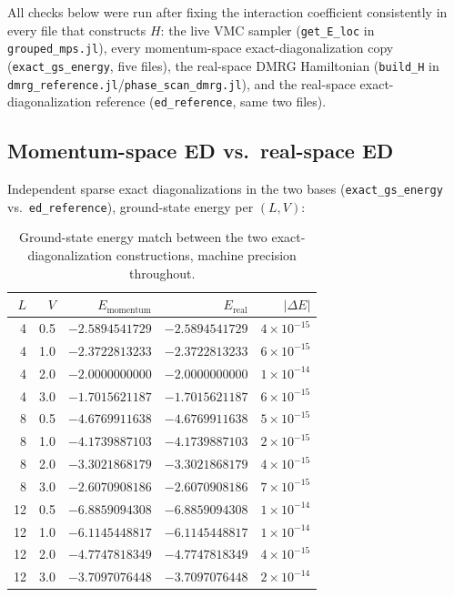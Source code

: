 \documentclass[11pt]{article}
\begin{document}
All checks below were run after fixing the interaction coefficient
consistently in every file that constructs $H$: the live VMC sampler
(\texttt{get\_E\_loc} in \texttt{grouped\_mps.jl}), every momentum-space
exact-diagonalization copy (\texttt{exact\_gs\_energy}, five files), the
real-space DMRG Hamiltonian (\texttt{build\_H} in
\texttt{dmrg\_reference.jl}/\texttt{phase\_scan\_dmrg.jl}), and the
real-space exact-diagonalization reference (\texttt{ed\_reference}, same two
files).

\subsection{Momentum-space ED vs.\ real-space ED}

Independent sparse exact diagonalizations in the two bases
(\texttt{exact\_gs\_energy} vs.\ \texttt{ed\_reference}), ground-state
energy per $(L,V)$:

\begin{table}[h]
\centering
\begin{tabular}{@{}rrrrr@{}}
\toprule
$L$ & $V$ & $E_{\text{momentum}}$ & $E_{\text{real}}$ & $|\Delta E|$ \\
\midrule
4  & 0.5 & $-2.5894541729$ & $-2.5894541729$ & $4\times10^{-15}$ \\
4  & 1.0 & $-2.3722813233$ & $-2.3722813233$ & $6\times10^{-15}$ \\
4  & 2.0 & $-2.0000000000$ & $-2.0000000000$ & $1\times10^{-14}$ \\
4  & 3.0 & $-1.7015621187$ & $-1.7015621187$ & $6\times10^{-15}$ \\
8  & 0.5 & $-4.6769911638$ & $-4.6769911638$ & $5\times10^{-15}$ \\
8  & 1.0 & $-4.1739887103$ & $-4.1739887103$ & $2\times10^{-15}$ \\
8  & 2.0 & $-3.3021868179$ & $-3.3021868179$ & $4\times10^{-15}$ \\
8  & 3.0 & $-2.6070908186$ & $-2.6070908186$ & $7\times10^{-15}$ \\
12 & 0.5 & $-6.8859094308$ & $-6.8859094308$ & $1\times10^{-14}$ \\
12 & 1.0 & $-6.1145448817$ & $-6.1145448817$ & $1\times10^{-14}$ \\
12 & 2.0 & $-4.7747818349$ & $-4.7747818349$ & $4\times10^{-15}$ \\
12 & 3.0 & $-3.7097076448$ & $-3.7097076448$ & $2\times10^{-14}$ \\
\bottomrule
\end{tabular}
\caption{Ground-state energy match between the two exact-diagonalization
constructions, machine precision throughout.}
\end{table}
\end{document}
